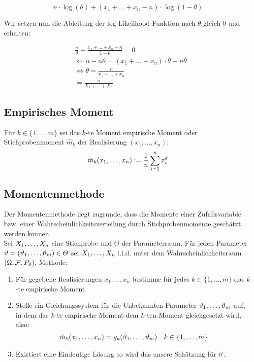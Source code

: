 \[
  n \cdot \log (\theta) +  (x_1 + \ldots + x_n - n) \cdot \log (1 - \theta)
\]

Wir setzen nun die Ableitung der log-Likelihood-Funktion nach $\theta$ gleich
$0$ und erhalten:

\begin{align*}
   & \frac{n}{\theta} - \frac{x_1 + \ldots + x_n - n}{1 - \theta} = 0               \\
   & \Longleftrightarrow n - n\theta =  (x_1 + \ldots + x_n) \cdot \theta - n\theta \\
   & \Longleftrightarrow \theta = \frac{n}{x_1 + \ldots + x_n}                      \\
   & = \frac{n}{X_1 + \ldots + X_n}
\end{align*}

\BoxEnd{}
\subsection*{Empirisches Moment}
Für $k \in \{1, \dots, m\}$ sei das $k$-te Moment empirische Moment oder
Stichprobenmoment $\hat{m}_k$ der Realisierung $ (x_1, \dots, x_n)$:
\begin{align*}
  \hat{m}_k (x_1, \dots, x_n) := \frac{1}{n} \sum_{i = 1}^n x_i^k
\end{align*}
\subsection*{Momentenmethode}
Der Momentenmethode liegt zugrunde, dass die Momente einer Zufallsvariable bzw.
einer Wahrscheinlichkeitsverteilung durch Stichprobenmomente geschätzt werden
können.\\ Sei $X_1, \dots, X_n$ eine Stichprobe und $\varTheta$ der
Parameterraum. Für jeden Parameter $\vartheta = (\vartheta_1, \dots, \vartheta_m) \in \varTheta$
sei $X_1, \dots, X_n$ i.i.d. unter dem Wahrscheinlichkeitsraum $ (\Omega, \mathcal{F},
  P_\vartheta)$. Methode:
\begin{enumerate}
  \item Für gegebene Realisierungen $x_1, \dots, x_n$ bestimme für jedes $k \in \{1,
          \dots, m\}$ das $k$-te empirische Moment
  \item Stelle ein Gleichungssystem für die Unbekannten Parameter $\vartheta_1, \dots, \vartheta_m$
        auf, in dem das $k$-te empirische Moment dem $k$-ten Moment gleichgesetzt wird,
        also:
        \begin{align*}
          \hat{m}_k (x_1, \dots, x_n) = g_k (\vartheta_1, \dots, \vartheta_m)
           &  & k \in \{1, \dots, m\}
        \end{align*}
  \item Existiert eine Eindeutige Lösung so wird das unsere Schätzung für $\vartheta$.
\end{enumerate}
